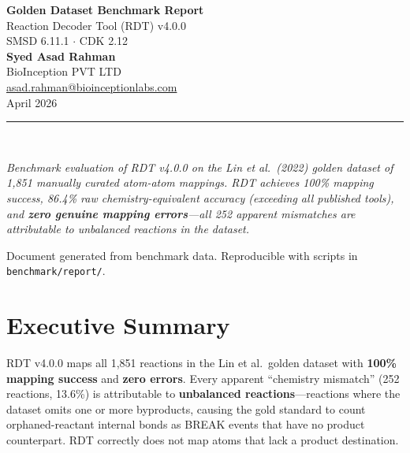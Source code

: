 \documentclass[11pt,a4paper]{article}
\begin{document}
\begin{titlepage}
\centering
\vspace*{3cm}

{\Huge\bfseries\color{linkblue} Golden Dataset Benchmark Report}\\[0.8cm]
{\LARGE Reaction Decoder Tool (RDT) v4.0.0}\\[0.4cm]
{\large SMSD 6.11.1 $\cdot$ CDK 2.12}\\[2cm]

{\large
\textbf{Syed Asad Rahman}\\[0.3cm]
BioInception PVT LTD\\[0.1cm]
\href{mailto:asad.rahman@bioinceptionlabs.com}{asad.rahman@bioinceptionlabs.com}
}\\[2cm]

{\large April 2026}\\[1.5cm]

\rule{\textwidth}{0.4pt}\\[0.5cm]

\begin{minipage}{0.85\textwidth}
\centering
\textit{%
Benchmark evaluation of RDT v4.0.0 on the Lin et al.\ (2022) golden dataset
of 1,851 manually curated atom-atom mappings. RDT achieves 100\% mapping success,
86.4\% raw chemistry-equivalent accuracy (exceeding all published tools), and
\textbf{zero genuine mapping errors}---all 252 apparent mismatches are attributable
to unbalanced reactions in the dataset.
}
\end{minipage}

\vfill
{\footnotesize Document generated from benchmark data. Reproducible with scripts in \texttt{benchmark/report/}.}
\end{titlepage}

\tableofcontents
\newpage

\section{Executive Summary}

RDT v4.0.0 maps all 1,851 reactions in the Lin et al.\ golden dataset with
\textbf{100\% mapping success} and \textbf{zero errors}. Every apparent
``chemistry mismatch'' (252 reactions, 13.6\%) is attributable to
\textbf{unbalanced reactions}---reactions where the dataset omits one or more
byproducts, causing the gold standard to count orphaned-reactant internal bonds
as BREAK events that have no product counterpart. RDT correctly does not map
atoms that lack a product destination.
\end{document}
